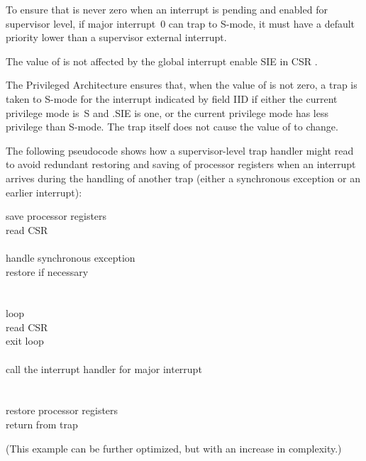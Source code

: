 \begin{commentary}
To ensure that  is never zero when an interrupt is pending
and enabled for supervisor level, if major interrupt~0 can trap to
\hbox{S-mode}, it must have a default priority lower than a supervisor
external interrupt.
\end{commentary}

The value of  is not affected by
the global interrupt enable SIE in CSR .

The {\RISCV} Privileged Architecture ensures that, when the value
of  is not zero, a trap is taken to \mbox{S-mode} for the
interrupt indicated by field IID if either the current privilege
mode is~S and .SIE is one, or the current
privilege mode has less privilege than \mbox{S-mode}.
The trap itself does not cause the value of  to change.

The following pseudocode shows how a supervisor-level trap handler
might read  to avoid redundant restoring and saving of
processor registers when an interrupt arrives during the handling of
another trap (either a synchronous exception or an earlier interrupt):
\begin{displayLinesTable}
save processor registers \\
read CSR  \\
 \\
\qquad handle synchronous exception  \\
\qquad restore  if necessary \\
\z{\RB}\\
 \\
\qquad loop \z{\LB} \\
\qquad\qquad {}read CSR  \\
\qquad\qquad {} exit loop \\
\qquad\qquad {} \\
\qquad\qquad call the interrupt handler for major interrupt  \\
\qquad \z{\RB} \\
\z{\RB} \\
restore processor registers \\
return from trap \\
\end{displayLinesTable}
(This example can be further optimized, but with an increase in
complexity.)

